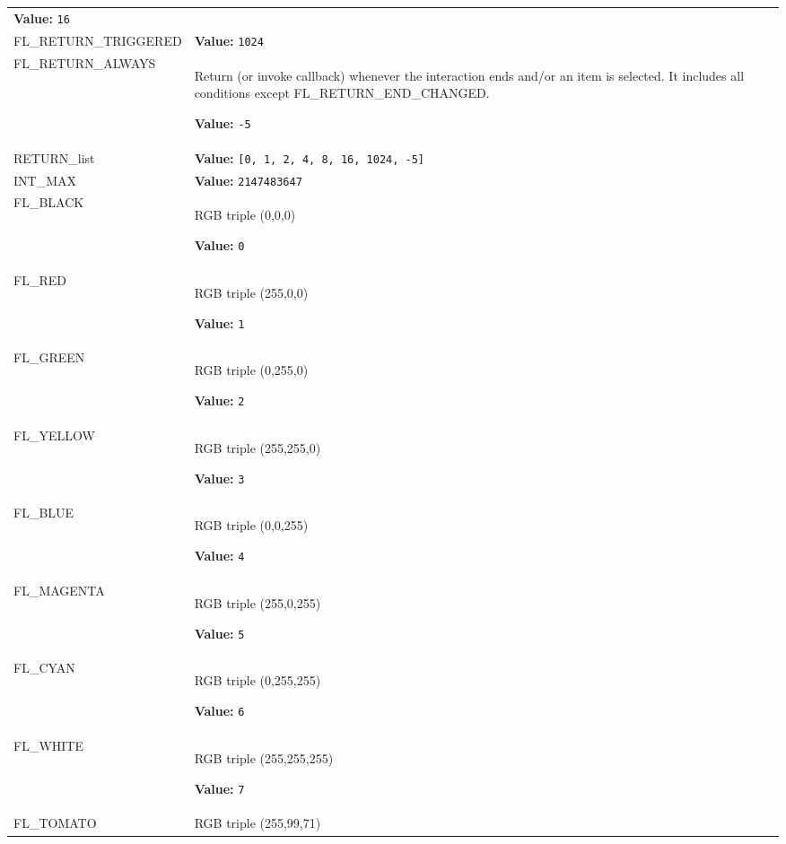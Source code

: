 \begin{longtable}{|p{\varnamewidth}|p{\vardescrwidth}|l}
\textbf{Value:} 
{\tt 16}&\\
\cline{1-2}
\raggedright F\-L\-\_\-R\-E\-T\-U\-R\-N\-\_\-T\-R\-I\-G\-G\-E\-R\-E\-D\- & \raggedright \textbf{Value:} 
{\tt 1024}&\\
\cline{1-2}
\raggedright F\-L\-\_\-R\-E\-T\-U\-R\-N\-\_\-A\-L\-W\-A\-Y\-S\- & \raggedright Return (or invoke callback) whenever the interaction ends and/or
an item is selected. It includes all conditions except
FL\_RETURN\_END\_CHANGED.

\textbf{Value:} 
{\tt -5}&\\
\cline{1-2}
\raggedright R\-E\-T\-U\-R\-N\-\_\-l\-i\-s\-t\- & \raggedright \textbf{Value:} 
{\tt \texttt{[}0\texttt{, }1\texttt{, }2\texttt{, }4\texttt{, }8\texttt{, }16\texttt{, }1024\texttt{, }-5\texttt{]}}&\\
\cline{1-2}
\raggedright I\-N\-T\-\_\-M\-A\-X\- & \raggedright \textbf{Value:} 
{\tt 2147483647}&\\
\cline{1-2}
\raggedright F\-L\-\_\-B\-L\-A\-C\-K\- & \raggedright RGB triple (0,0,0)

\textbf{Value:} 
{\tt 0}&\\
\cline{1-2}
\raggedright F\-L\-\_\-R\-E\-D\- & \raggedright RGB triple (255,0,0)

\textbf{Value:} 
{\tt 1}&\\
\cline{1-2}
\raggedright F\-L\-\_\-G\-R\-E\-E\-N\- & \raggedright RGB triple (0,255,0)

\textbf{Value:} 
{\tt 2}&\\
\cline{1-2}
\raggedright F\-L\-\_\-Y\-E\-L\-L\-O\-W\- & \raggedright RGB triple (255,255,0)

\textbf{Value:} 
{\tt 3}&\\
\cline{1-2}
\raggedright F\-L\-\_\-B\-L\-U\-E\- & \raggedright RGB triple (0,0,255)

\textbf{Value:} 
{\tt 4}&\\
\cline{1-2}
\raggedright F\-L\-\_\-M\-A\-G\-E\-N\-T\-A\- & \raggedright RGB triple (255,0,255)

\textbf{Value:} 
{\tt 5}&\\
\cline{1-2}
\raggedright F\-L\-\_\-C\-Y\-A\-N\- & \raggedright RGB triple (0,255,255)

\textbf{Value:} 
{\tt 6}&\\
\cline{1-2}
\raggedright F\-L\-\_\-W\-H\-I\-T\-E\- & \raggedright RGB triple (255,255,255)

\textbf{Value:} 
{\tt 7}&\\
\cline{1-2}
\raggedright F\-L\-\_\-T\-O\-M\-A\-T\-O\- & \raggedright RGB triple (255,99,71)


\end{longtable}
